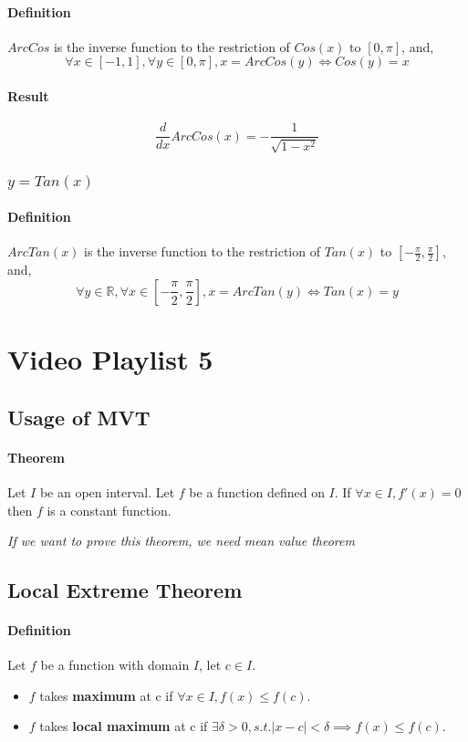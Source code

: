 \documentclass{article}
\begin{document}
	\paragraph{Definition} $ArcCos$ is the inverse function to the restriction of $Cos(x)$ to $[0,\pi]$, and, 
	\[
		\forall x \in [-1,1], \forall y \in [0,\pi], x = ArcCos(y) \iff Cos(y) = x
	\]
	\paragraph{Result}
	\[
		\frac{d}{dx}ArcCos(x) = -\frac{1}{\sqrt{1 - x^2}}
	\]

	\subsubsection{$y = Tan(x)$}
	\paragraph{Definition} $ArcTan(x)$ is the inverse function to the restriction of $Tan(x)$ to $[-\frac{\pi}{2}, \frac{\pi}{2}]$, and, 
	\[
		\forall y \in \mathbb{R}, \forall x \in [-\frac{\pi}{2}, \frac{\pi}{2}], x = ArcTan(y) \iff Tan(x) = y
	\]

	\section{Video Playlist 5}
	\subsection{Usage of MVT}
	\paragraph{Theorem} Let $I$ be an open interval. Let $f$ be a function defined on $I$. If $\forall x \in I, f'(x) = 0$ then $f$ is a constant function.

	\emph{If we want to prove this theorem, we need mean value theorem}
	\subsection{Local Extreme Theorem}
	\paragraph{Definition} Let $f$ be a function with domain $I$, let $c \in I$.
	\begin{itemize}
		\item $f$ takes \textbf{maximum} at c if $\forall x \in I, f(x) \leq f(c)$.
		\item $f$ takes \textbf{local maximum} at c if $\exists \delta > 0, s.t. \lvert x - c \rvert < \delta \implies f(x) \leq f(c)$.
	\end{itemize}
\end{document}
